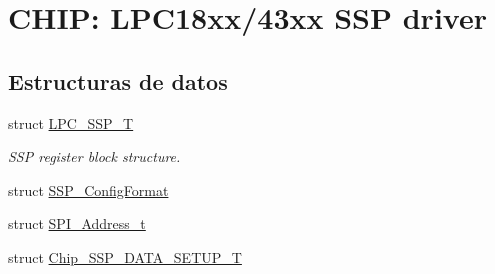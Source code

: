 \hypertarget{group___s_s_p__18_x_x__43_x_x}{}\section{C\+H\+IP\+: L\+P\+C18xx/43xx S\+SP driver}
\label{group___s_s_p__18_x_x__43_x_x}
\subsection*{Estructuras de datos}
\begin{DoxyCompactItemize}
\item 
struct \hyperlink{struct_l_p_c___s_s_p___t}{L\+P\+C\+\_\+\+S\+S\+P\+\_\+T}
\begin{DoxyCompactList}\small\item\em S\+SP register block structure. \end{DoxyCompactList}\item 
struct \hyperlink{struct_s_s_p___config_format}{S\+S\+P\+\_\+\+Config\+Format}
\item 
struct \hyperlink{struct_s_p_i___address__t}{S\+P\+I\+\_\+\+Address\+\_\+t}
\item 
struct \hyperlink{struct_chip___s_s_p___d_a_t_a___s_e_t_u_p___t}{Chip\+\_\+\+S\+S\+P\+\_\+\+D\+A\+T\+A\+\_\+\+S\+E\+T\+U\+P\+\_\+T}
\end{DoxyCompactItemize}

